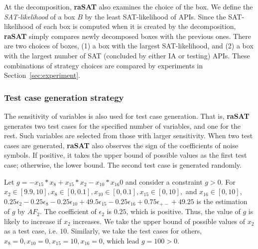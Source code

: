 \documentclass[runningheads,a4paper,oribibl]{llncs}
\newcommand{\suppress}[1]{} %
\begin{document}
At the decomposition, {\bf raSAT} also examines the choice of the box.
We define the {\em SAT-likelihood} of a box $B$ by 
the least SAT-likelihood of APIs. 
Since the SAT-likelihood of each box is computed when it is created by the decomposition,
{\bf raSAT} simply compares newly decomposed boxes with the previous ones. 
There are two choices of boxes, 
(1) a box with the largest SAT-likelihood, and 
(2) a box with the largest number of SAT (concluded by either IA or testing) APIs. 
These combinations of strategy choices are compared by experiments in Section~\ref{sec:experiment}. 


\subsubsection*{Test case generation strategy}
\sloppy
The sensitivity of variables is also used for test case generation.
That is, {\bf raSAT} generates two test cases for the specified number of variables,
and one for the rest. 
Such variables are selected from those with larger sensitivity.
When two test cases are generated, {\bf raSAT} also observes
the sign of the coefficients of noise symbols.
If positive, it takes the upper bound of possible values as the first test case; 
otherwise, the lower bound. The second test case is generated randomly. 

\begin{example}
  Let $g = -x_{15}*x_8+x_{15}*x_2-x_{10}*x_{16}0$ and consider a constraint $g > 0$. 
  For ${x_2 \in [9.9, 10]}, {x_8 \in [0, 0.1]}, {x_{10} \in [0, 0.1]}, {x_{15} \in [0, 10]},$ and
  $ x_{16} \in [0, 10]$, 
  ${0.25 \epsilon_2 - 0.25 \epsilon_8 - 0.25 \epsilon_{10} + 49.5\epsilon_{15} - 0.25\epsilon_{16}
    + 0.75\epsilon_{+-} + 49.25}$ is the estimation of $g$ by $AF_2$. 
  The coefficient of $\epsilon_2$ is $0.25$, which is positive. 
  Thus, the value of $g$ is likely to increase if $x_2$ increases. 
  We take the upper bound of possible values of $x_2$ as a test case, i.e. $10$. 
  Similarly, we take the test cases for others, $x_8=0, x_{10}=0, x_{15}=10, x_{16}=0$, which lead $g=100 > 0$. 
\end{example}
\suppress{
I. Selecting API for testing:
  (1) Difficulty first by SAT-likelihood.   
  (2) Easy first by SAT-likelihood
  (10) Random.,
II. Selecting Variable:
  (8) With sensitivity
  (9) Without sensitivity - Random: 
III. Selecting box:
  (3) SAT-directed using IA-testing.
  (4) UNSAT-directed using IA-testing.
  (5) SAT-directed using SAT-likelihood
  (6) UNSAT-directed using SAT-likelihood
  (7) Random
}
\end{document}
